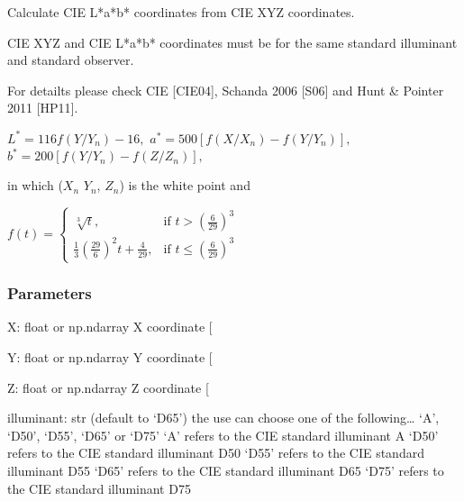 \documentclass[letterpaper,10pt,english]{sphinxmanual}
\begin{document}
\begin{fulllineitems}
\label{\detokenize{07_colors:skinoptics.colors.Lab_from_XYZ}}
\pysigstartsignatures
{}
\pysigstopsignatures
\begin{DUlineblock}{0em}
\item[] Calculate CIE L*a*b* coordinates from CIE XYZ coordinates.
\item[] CIE XYZ and CIE L*a*b* coordinates must be for the same standard illuminant and standard observer.
\item[] For detailts please check CIE {[}CIE04{]}, Schanda 2006 {[}S06{]} and Hunt \& Pointer 2011 {[}HP11{]}.
\end{DUlineblock}

\sphinxAtStartPar
\(L^* = 116 f(Y/Y_n) - 16,\)
\(a^* = 500 [f(X/X_n) - f(Y/Y_n)],\)
\(b^* = 200 [f(Y/Y_n) - f(Z/Z_n)],\)

\sphinxAtStartPar
in which (\(X_n\) \(Y_n\), \(Z_n\)) is the white point and

\sphinxAtStartPar
\(f(t) = \left\{ 
\begin{matrix}
\sqrt[3]{t}, & \mbox{if }  t > \left(\frac{6}{29}\right)^3 \\
\frac{1}{3}\left(\frac{29}{6}\right)^2 t + \frac{4}{29}, & \mbox{if }  t \le \left(\frac{6}{29}\right)^3
\end{matrix}\right.\)


\subsubsection{Parameters}
\label{\detokenize{07_colors:id11}}
\sphinxAtStartPar
X: float or np.ndarray
X coordinate {[}\sphinxhyphen{}{]}

\sphinxAtStartPar
Y: float or np.ndarray
Y coordinate {[}\sphinxhyphen{}{]}

\sphinxAtStartPar
Z: float or np.ndarray
Z coordinate {[}\sphinxhyphen{}{]}

\sphinxAtStartPar
illuminant: str (default to ‘D65’)
the use can choose one of the following… ‘A’, ‘D50’, ‘D55’, ‘D65’ or ‘D75’
‘A’ refers to the CIE standard illuminant A
‘D50’ refers to the CIE standard illuminant D50
‘D55’ refers to the CIE standard illuminant D55
‘D65’ refers to the CIE standard illuminant D65
‘D75’ refers to the CIE standard illuminant D75


\end{fulllineitems}
\end{document}
